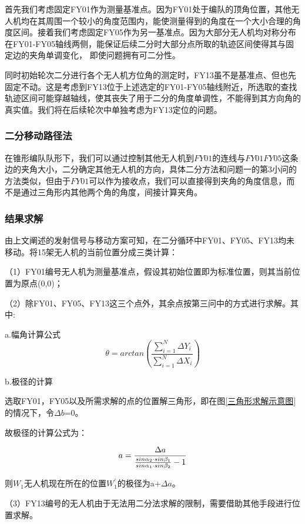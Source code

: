 \documentclass{ctexart}
\begin{document}
首先我们考虑固定FY01作为测量基准点。因为FY01处于编队的顶角位置，其他无人机均在其周围一个较小的角度范围内，能使测量得到的角度在一个大小合理的角度区间。接着我们考虑固定FY05作为另一基准点。因为大部分无人机均对称分布在FY01-FY05轴线两侧，能保证后续二分时大部分点所取的轨迹区间使得其与固定边的夹角单调变化，
即使问题拥有可二分性。

同时初始轮次二分进行各个无人机方位角的测定时，FY13虽不是基准点、但也先固定不动。这是考虑到FY13位于上述选定的FY01-FY05轴线附近，所选取的查找轨迹区间可能穿越轴线，使其丧失了用于二分的角度单调性，不能得到其方向角的真实值。我们将在后续轮次中单独考虑为FY13定位的问题。

\subsubsection{二分移动路径法}
在锥形编队队形下，我们可以通过控制其他无人机到$FY01$的连线与$FY01FY05$这条边的夹角大小，二分确定其他无人机的方向，具体二分方法和问题一的第3小问的方法类似，但由于$FY01$可以作为接收点，我们可以直接得到夹角的角度信息，而不是通过三角形内其他两个角的角度，间接计算夹角。

\subsubsection{结果求解}

由上文阐述的发射信号与移动方案可知，在二分循环中FY01、FY05、FY13均未移动。将15架无人机的当前位置分成三类计算：

（1）FY01编号无人机为测量基准点，假设其初始位置即为标准位置，则其当前位置为原点(0,0)；

（2）除FY01、FY05、FY13这三个点外，其余点按第三问中的方式进行求解。其中:

a.幅角计算公式
\[
  \theta=arctan(\frac{\sum_{i=1}^{N}\Delta Y_i}{\sum_{i=1}^{N}\Delta X_i})
\]

b.极径的计算

选取FY01，FY05以及所需求解的点的位置解三角形，即在图\ref{三角形求解示意图}的情况下，令$\Delta b$=0。

故极径的计算公式为：

\begin{equation}
              a=\frac{\Delta a}{\frac{sin\alpha_2\cdot sin\beta_1}{sin\alpha_1\cdot sin\beta_2}-1}\\
\end{equation}

则$W_1$无人机现在所在的位置$W_1^{'}$的极径为a+$\Delta a$。

（3）FY13编号的无人机由于无法用二分法求解的限制，需要借助其他手段进行位置求解。
\end{document}
